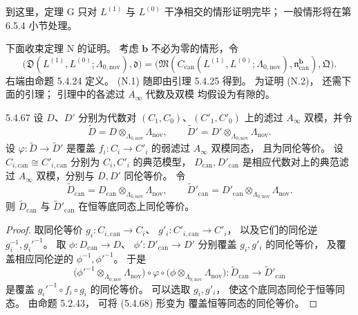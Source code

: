 到这里，定理 G 只对
$L^{(1)}$ 与 $L^{(0)}$
干净相交的情形证明完毕；
一般情形将在第 6.5.4 小节处理。

下面收束定理 N 的证明。
考虑 $\mathbf b$ 不必为零的情形，令
\[
\bigl(
\mathfrak D(L^{(1)},L^{(0)};
\Lambda_{0,\mathrm{nov}}),
\mathfrak d
\bigr)
=
\bigl(
\mathfrak M(
C_{\mathrm{can}}(L^{(1)},L^{(0)};
\Lambda_{0,\mathrm{nov}}),
\mathfrak n_{\mathrm{can}}^{\mathbf b}),
\mathfrak Q
\bigr).
\]
右端由命题 5.4.24 定义。
\textup{(N.1)} 随即由引理 5.4.25 得到。
为证明 \textup{(N.2)}，
还需下面的引理；
引理中的各滤过 $A_\infty$ 代数及双模
均假设为有隙的。

\begin{lemma}{5.4.67}\label{lem:5-4-67}
设 $D$、$D'$ 分别为代数对
$(C_1,C_0)$、$(C'_1,C'_0)$
上的滤过 $A_\infty$ 双模，并令
\[
\widetilde D
=D\otimes_{\Lambda_{0,\mathrm{nov}}}
\Lambda_{\mathrm{nov}},
\qquad
\widetilde D'
=D'\otimes_{\Lambda_{0,\mathrm{nov}}}
\Lambda_{\mathrm{nov}}.
\]
设
$\varphi\colon\widetilde D\to\widetilde D'$
是覆盖 $f_i\colon C_i\to C'_i$
的弱滤过 $A_\infty$ 双模同态，
且为同伦等价。
设
$C_{i,\mathrm{can}}\cong C'_{i,\mathrm{can}}$
分别为 $C_i,C'_i$ 的典范模型，
$D_{\mathrm{can}},D'_{\mathrm{can}}$
是相应代数对上的典范滤过
$A_\infty$ 双模，分别与 $D,D'$
同伦等价。
令
\[
\widetilde D_{\mathrm{can}}
=D_{\mathrm{can}}
\otimes_{\Lambda_{0,\mathrm{nov}}}
\Lambda_{\mathrm{nov}},
\qquad
\widetilde D'_{\mathrm{can}}
=D'_{\mathrm{can}}
\otimes_{\Lambda_{0,\mathrm{nov}}}
\Lambda_{\mathrm{nov}}.
\]
则 $\widetilde D_{\mathrm{can}}$
与 $\widetilde D'_{\mathrm{can}}$
在恒等底同态上同伦等价。
\end{lemma}
\begin{proof}
取同伦等价
$g_i\colon C_{i,\mathrm{can}}\to C_i$、
$g'_i\colon C'_{i,\mathrm{can}}\to C'_i$，
以及它们的同伦逆
$g_i^{-1},g_i'^{-1}$。
取
$\phi\colon D_{\mathrm{can}}\to D$、
$\phi'\colon D'_{\mathrm{can}}\to D'$
分别覆盖 $g_i,g'_i$
的同伦等价，
及覆盖相应同伦逆的
$\phi^{-1},\phi'^{-1}$。
于是
\begin{equation}
\bigl(
\phi'^{-1}\otimes_{\Lambda_{0,\mathrm{nov}}}
\Lambda_{\mathrm{nov}}
\bigr)
\circ\varphi\circ
\bigl(
\phi\otimes_{\Lambda_{0,\mathrm{nov}}}
\Lambda_{\mathrm{nov}}
\bigr)
:
\widetilde D_{\mathrm{can}}
\longrightarrow
\widetilde D'_{\mathrm{can}}
\tag{5.4.68}\label{eq:5-4-68}
\end{equation}
是覆盖
$g_i'^{-1}\circ f_i\circ g_i$
的同伦等价。
可以选取 $g_i,g'_i$，
使这个底同态同伦于恒等同态。
由命题 5.2.43，
可将 (5.4.68) 形变为
覆盖恒等同态的同伦等价。
\end{proof}

